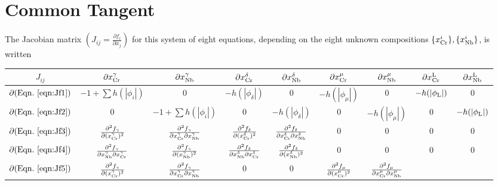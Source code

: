 \documentclass[10pt]{article}
\begin{document}
	\section{Common Tangent}\label{app:jacobian}
		The Jacobian matrix $\left(J_{ij}=\frac{\partial f_i}{\partial x_j}\right)$ for this system of eight equations, depending on the eight unknown compositions $\{x_{\ce{Cr}}^i\}, \{x_{\ce{Nb}}^i\}$, is written
		
		\begin{table}[ht]\centering
		\begin{small}
		\begin{tabular}{|c|cccccccc|}\hline
		$J_{ij}$  & $\partial x_{\ce{Cr}}^{\gamma}$ & $\partial x_{\ce{Nb}}^{\gamma}$ & $\partial x_{\ce{Cr}}^{\delta}$ & $\partial x_{\ce{Nb}}^{\delta}$
		  & $\partial x_{\ce{Cr}}^{\mu}$ & $\partial x_{\ce{Nb}}^{\mu}$ & $\partial x_{\ce{Cr}}^{\ce{L}}$ & $\partial x_{\ce{Nb}}^{\ce{L}}$\\\hline
		$\partial (\mathrm{Eqn.}~{\ref{eqn:Jf1}})$ & $-1+\sum h(|\phi_i|)$ & 0 & $-h(|\phi_{\delta}|)$ & 0 & $-h(|\phi_{\mu}|)$ & 0 & $-h(|\phi_{\ce{L}}|)$ & 0\\
		$\partial (\mathrm{Eqn.}~{\ref{eqn:Jf2}})$ & 0 & $-1+\sum h(|\phi_i|)$ & 0 & $-h(|\phi_{\delta}|)$ & 0 & $-h(|\phi_{\mu}|)$ & 0 & $-h(|\phi_{\ce{L}}|)$\\
		$\partial (\mathrm{Eqn.}~{\ref{eqn:Jf3}})$ & $\frac{\partial^2 f_{\gamma}}{\partial(x_{\ce{Cr}}^{\gamma})^2}$ & $\frac{\partial^2 f_{\gamma}}{\partial x_{\ce{Cr}}^{\gamma}\partial x_{\ce{Nb}}^{\gamma}}$ 
		& $\frac{\partial^2 f_{\delta}}{\partial(x_{\ce{Cr}}^{\delta})^2}$ & $\frac{\partial^2 f_{\delta}}{\partial x_{\ce{Cr}}^{\delta}\partial x_{\ce{Nb}}^{\delta}}$
		& 0 & 0 & 0 & 0\\
		$\partial (\mathrm{Eqn.}~{\ref{eqn:Jf4}})$ & $\frac{\partial^2 f_{\gamma}}{\partial x_{\ce{Nb}}^{\gamma}\partial x_{\ce{Cr}}^{\gamma}}$ & $\frac{\partial^2 f_{\gamma}}{\partial(x_{\ce{Nb}}^{\gamma})^2}$
		& $\frac{\partial^2 f_{\delta}}{\partial x_{\ce{Nb}}^{\delta} \partial x_{\ce{Cr}}^{\delta}}$ & $\frac{\partial^2 f_{\delta}}{\partial(x_{\ce{Nb}}^{\delta})^2}$
		& 0 & 0 & 0 & 0\\
		$\partial (\mathrm{Eqn.}~{\ref{eqn:Jf5}})$ & $\frac{\partial^2 f_{\gamma}}{\partial(x_{\ce{Cr}}^{\gamma})^2}$ & $\frac{\partial^2 f_{\gamma}}{\partial x_{\ce{Cr}}^{\gamma}\partial x_{\ce{Nb}}^{\gamma}}$ 
		& 0 & 0 & $\frac{\partial^2 f_{\mu}}{\partial(x_{\ce{Cr}}^{\mu})^2}$ & $\frac{\partial^2 f_{\mu}}{\partial x_{\ce{Cr}}^{\mu}\partial x_{\ce{Nb}}^{\mu}}$

\end{tabular}
\end{small}
\end{table}
\end{document}
